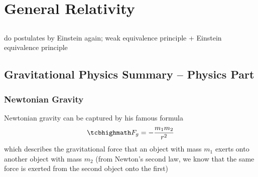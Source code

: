 




\chapter{General Relativity}

	\section{}

do postulates by Einstein again; weak equivalence principle + Einstein equivalence principle



\newpage



	\section{Gravitational Physics Summary -- Physics Part}



		\subsection{Newtonian Gravity}
Newtonian gravity can be captured by his famous formula
\begin{equation}
\eqbox{
F_g = - \frac{m_1 m_2}{r^2}
}
\end{equation}
which describes the gravitational force that an object with mass $m_1$ exerts onto another object with mass $m_2$ (from Newton's second law, we know that the same force is exerted from the second object onto the first)


